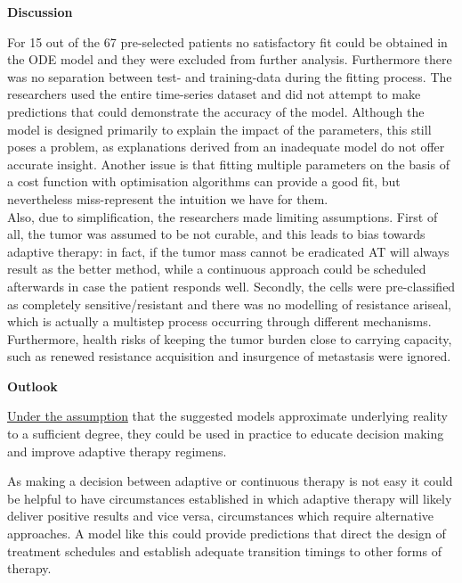 \documentclass[11pt,a4paper]{article}
\begin{document}
 \vspace{2mm}

\textbf{Discussion}

 \vspace{1mm}

For 15 out of the 67 pre-selected patients no satisfactory fit could be obtained in the ODE model and they were excluded from further analysis. 
Furthermore there was no separation between test- and training-data during the fitting process. 
The researchers used the entire time-series dataset and did not attempt to make predictions that could demonstrate the accuracy of the model.
Although the model is designed primarily to explain the impact of the parameters, this still poses a problem, 
as explanations derived from an inadequate model do not offer accurate insight.
Another issue is that fitting multiple parameters on the basis of a cost function with optimisation algorithms can provide a good fit,
but nevertheless miss-represent the intuition we have for them. \\

Also, due to simplification, the researchers made limiting assumptions.
First of all, the tumor was assumed to be not curable, and this leads to bias towards adaptive therapy: in fact, if the tumor mass cannot be eradicated AT will always result as the better method, while a continuous approach could be scheduled afterwards in case the patient responds well.
Secondly, the cells were pre-classified as completely sensitive/resistant and there was no modelling of resistance ariseal, which is actually a multistep process occurring through different mechanisms.
Furthermore, health risks of keeping the tumor burden close to carrying capacity, such as renewed resistance acquisition and insurgence of metastasis were ignored. \\

\vspace{2mm}

\textbf{Outlook}

 \vspace{1mm}

\underline{Under the assumption} that the suggested models approximate underlying reality to a sufficient degree,
they could be used in practice to educate decision making and improve adaptive therapy regimens.

As making a decision between adaptive or continuous therapy is not easy it could be helpful to have circumstances established
 in which adaptive therapy will likely deliver positive results and vice versa, circumstances which require alternative approaches. 
 A model like this could provide predictions that direct the design of treatment schedules and establish adequate transition timings to other forms of therapy. 
 
\end{document}
